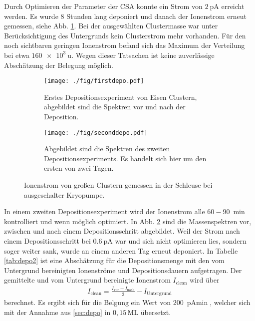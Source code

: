 Durch Optimieren der Parameter der CSA konnte ein Strom von $\SI{2}{\pA}$ erreicht werden.
Es wurde 8 Stunden lang deponiert und danach der Ionenstrom erneut gemessen, siehe Abb. \ref{fig:firstdepo}.
Bei der ausgewählten Clustermasse war unter Berücksichtigung des Untergrunds kein Clusterstrom mehr vorhanden. 
Für den noch sichtbaren geringen Ionenstrom befand sich das Maximum der Verteilung bei etwa $\SI{160e3}{\amu}$.
Wegen dieser Tatsachen ist keine zuverlässige Abschätzung der Belegung möglich.\\
\begin{figure}[h]
  \begin{subfigure}[h]{\textwidth}
    \texttt{[image: ./fig/firstdepo.pdf]}
    \caption{Erstes Depositionsexperiment von Eisen Clustern, abgebildet sind die Spektren vor und nach der Deposition.}
    \label{fig:firstdepo}
  \end{subfigure}\hfill
  \begin{subfigure}[t]{\textwidth}
    \texttt{[image: ./fig/seconddepo.pdf]}
    \caption{Abgebildet sind die Spektren des zweiten Depositionsexperiments. Es handelt sich hier um den ersten von zwei Tagen.}
    \label{fig:seconddepo}
  \end{subfigure}
  \caption{Ionenstrom von großen Clustern gemessen in der Schleuse bei ausgeschalter Kryopumpe.} 
  \label{fig:deposition}
\end{figure}

In einem zweiten Depositionsexperiment wird der Ionenstrom alle $60 - \SI{90}{\min}$ kontrolliert und wenn möglich optimiert.
In Abb. \ref{fig:seconddepo} sind die Massenspektren vor, zwischen und nach einem Depositionsschritt abgebildet. 
Weil der Strom nach einem Depositionsschritt bei $\SI{0.6}{\pA}$ war und sich nicht optimieren lies, sondern soger weiter sank, wurde an einem anderen Tag erneut deponiert.
In Tabelle \ref{tab:depo2} ist eine Abschätzung für die Depositionsmenge mit den vom Untergrund bereinigten Ionenströme und Depositionsdauern aufgetragen. Der gemittelte und vom Untergrund bereinigte Ionenstrom $I_{\text{clean}}$ wird über
\begin{align*}
  I_{\text{clean}}=\frac{I_{\text{vor}}+I_{\text{nach}}}{2}-I_{\text{Untergrund}}
\end{align*} 
berechnet. Es ergibt sich für die Belgung ein Wert von $\SI{200}{\pA\min}$, welcher sich mit der Annahme aus \ref{sec:depo} in $0,15\,$ML übersetzt.

